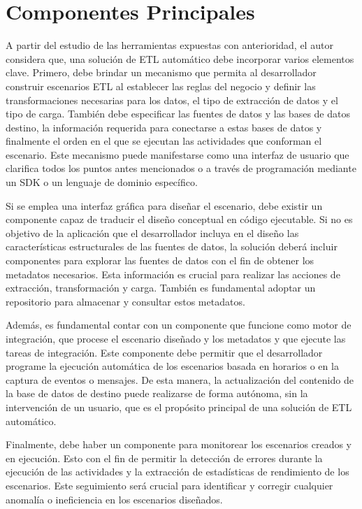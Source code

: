 \section{Componentes Principales} \label{section:PrincipalComp}

A partir del estudio de las herramientas expuestas con anterioridad, el autor considera que, 
una solución de ETL automático debe incorporar varios elementos clave. Primero, debe brindar 
un mecanismo que permita al desarrollador construir escenarios ETL al establecer las reglas del negocio y definir las 
transformaciones necesarias para los datos, el tipo de extracción de datos y el tipo de carga. 
También debe especificar las fuentes de datos y las bases de datos destino, 
la información requerida para conectarse a estas bases de datos y finalmente el orden en el que se ejecutan las actividades 
que conforman el escenario. Este mecanismo puede manifestarse como una interfaz de usuario que clarifica todos los puntos 
antes mencionados o a través de programación mediante un SDK o un lenguaje de dominio específico.

Si se emplea una interfaz gráfica para diseñar el escenario, debe existir un componente capaz de traducir el diseño 
conceptual en código ejecutable. Si no es objetivo de la aplicación que el desarrollador incluya en el diseño las características 
estructurales de las fuentes de datos, la solución deberá incluir componentes para explorar 
las fuentes de datos con el fin de obtener los metadatos necesarios. Esta información es crucial para realizar las acciones 
de extracción, transformación y carga. También es fundamental adoptar un repositorio para almacenar y consultar estos 
metadatos.

Además, es fundamental contar con un componente que funcione como motor de integración, que procese el escenario diseñado y 
los metadatos y que ejecute las tareas de integración. Este componente debe permitir que el desarrollador programe la ejecución 
automática de los escenarios basada en horarios o en la captura de eventos o mensajes. De esta manera, la actualización 
del contenido de la base de datos de destino puede realizarse de forma autónoma, sin la intervención de un usuario, que es 
el propósito principal de una solución de ETL automático.

Finalmente, debe haber un componente para monitorear los escenarios creados y en ejecución. Esto con el fin de permitir 
la detección de errores durante la ejecución de las actividades y la extracción de estadísticas de rendimiento de los 
escenarios. Este seguimiento será crucial para identificar y corregir cualquier anomalía o ineficiencia en los escenarios 
diseñados.  

